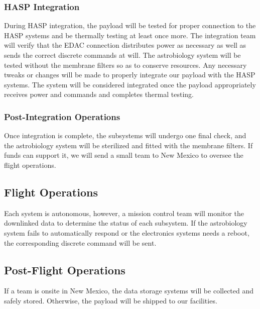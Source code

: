 \subsubsection{HASP Integration}
During HASP integration, the payload will be tested for proper connection to the HASP systems and be thermally testing at least once more.
The integration team will verify that the EDAC connection distributes power as necessary as well as sends the correct discrete commands at will.
The astrobiology system will be tested without the membrane filters so as to conserve resources.
Any necessary tweaks or changes will be made to properly integrate our payload with the HASP systems.
The system will be considered integrated once the payload appropriately receives power and commands and completes thermal testing.

\subsubsection{Post-Integration Operations}
Once integration is complete, the subsystems will undergo one final check, and the astrobiology system will be sterilized and fitted with the membrane filters. If funds can support it, we will send a small team to New Mexico to oversee the flight operations.

\subsection{Flight Operations}
Each system is autonomous, however, a mission control team will monitor the downlinked data to determine the status of each subsystem. If the astrobiology system fails to automatically respond or the electronics systems needs a reboot, the corresponding discrete command will be sent.

\subsection{Post-Flight Operations}
If a team is onsite in New Mexico, the data storage systems will be collected and safely stored. Otherwise, the payload will be shipped to our facilities.